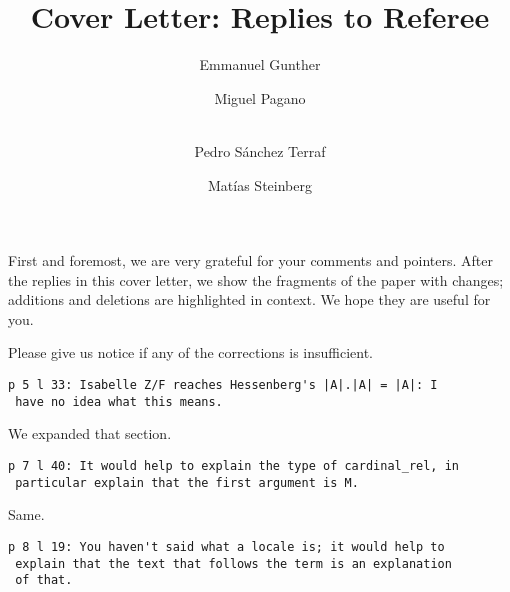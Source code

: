 \documentclass[runningheads]{llncs}
\begin{document}
%
\title{Cover Letter: Replies to Referee
}
%
%
\author{Emmanuel Gunther \and
Miguel Pagano \and \\
Pedro Sánchez Terraf%
\and
Matías Steinberg
}
%
%
%
\maketitle              %
%
First and foremost, we are very grateful for your comments and
pointers. After the replies in this cover letter, we show the
fragments of the paper with changes; additions and deletions are
highlighted in context. We hope they are useful for you.

Please give us notice if any of the corrections is insufficient.

\begin{verbatim}
p 5 l 33: Isabelle Z/F reaches Hessenberg's |A|.|A| = |A|: I
 have no idea what this means.
\end{verbatim}

We expanded that section.

\begin{verbatim}
p 7 l 40: It would help to explain the type of cardinal_rel, in
 particular explain that the first argument is M.
\end{verbatim}

Same.

\begin{verbatim}
p 8 l 19: You haven't said what a locale is; it would help to
 explain that the text that follows the term is an explanation
 of that.
\end{verbatim}
\end{document}
